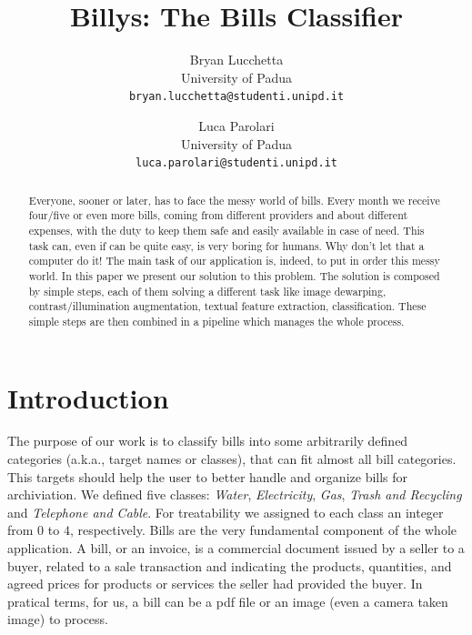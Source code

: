 \documentclass[10pt,twocolumn,letterpaper]{article}
\begin{document}
\title{Billys: The Bills Classifier}

\author{Bryan Lucchetta\\
{\small University of Padua}\\
{\tt\small bryan.lucchetta@studenti.unipd.it}
\and
Luca Parolari\\
{\small University of Padua}\\
{\tt\small luca.parolari@studenti.unipd.it}
}

\maketitle


\begin{abstract}
Everyone, sooner or later, has to face the messy world of bills. Every
month we receive four/five or even more bills, coming from different
providers and about different expenses, with the duty to keep them
safe and easily available in case of need. This task can, even if can
be quite easy, is very boring for humans. Why don't let that a
computer do it! The main task of our application is, indeed, to put in
order this messy world.  In this paper we present our solution to this
problem. The solution is composed by simple steps, each of them
solving a different task like image dewarping, contrast/illumination
augmentation, textual feature extraction, classification. These simple
steps are then combined in a pipeline which manages the whole process.
\end{abstract}


\section{Introduction}

The purpose of our work is to classify bills into some arbitrarily
defined categories (a.k.a., target names or classes), that can fit
almost all bill categories. This targets should help the user to
better handle and organize bills for archiviation. We defined five
classes: \emph{Water}, \emph{Electricity}, \emph{Gas}, \emph{Trash and
  Recycling} and \emph{Telephone and Cable}. For treatability we
assigned to each class an integer from $0$ to $4$, respectively. Bills
are the very fundamental component of the whole application. A bill,
or an invoice, is a commercial document issued by a seller to a buyer,
related to a sale transaction and indicating the products, quantities,
and agreed prices for products or services the seller had provided the
buyer. In pratical terms, for us, a bill can be a pdf file or an image
(even a camera taken image) to process.
\end{document}
